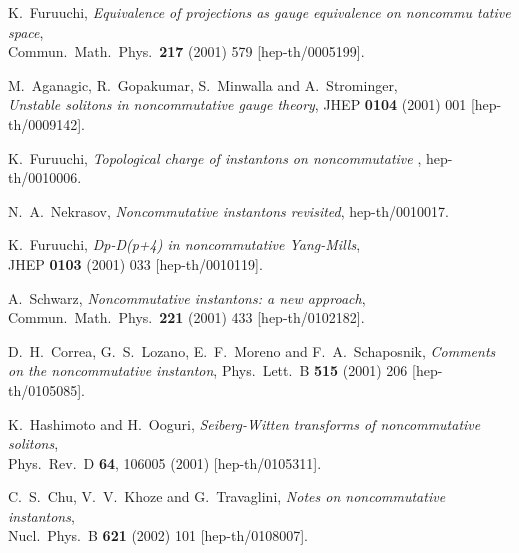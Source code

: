 \documentclass[a4paper,11pt,english]{article}
\numberwithin{equation}{section}
\renewcommand{\=}{\ =\ }
\begin{document}
\begin{thebibliography}{99}
         K.~Furuuchi,
         {\em Equivalence of projections as gauge equivalence on noncommu%
tative space},\\
         Commun.\ Math.\ Phys.\  {\bf 217} (2001) 579
         [hep-th/0005199].

         M.~Aganagic, R.~Gopakumar, S.~Minwalla and A.~Strominger,\\
         {\em Unstable solitons in noncommutative gauge theory},
         JHEP {\bf 0104} (2001) 001
         [hep-th/0009142].

         K.~Furuuchi,
         {\em Topological charge of \coordHE{} instantons on noncommutative \coordHE{}},
         hep-th/0010006.

         N.~A.~Nekrasov,
         {\em Noncommutative instantons revisited},
         hep-th/0010017.

         K.~Furuuchi,
         {\em Dp-D(p+4) in noncommutative Yang-Mills},\\
         JHEP {\bf 0103} (2001) 033
         [hep-th/0010119].

         A.~Schwarz,
         {\em Noncommutative instantons: a new approach},\\
         Commun.\ Math.\ Phys.\  {\bf 221} (2001) 433
         [hep-th/0102182].

         D.~H.~Correa, G.~S.~Lozano, E.~F.~Moreno and F.~A.~Schaposnik,
         {\em Comments on the \coordHE{} noncommutative instanton},
         Phys.\ Lett.\ B {\bf 515} (2001) 206
         [hep-th/0105085].

         K.~Hashimoto and H.~Ooguri,
         {\em Seiberg-Witten transforms of noncommutative solitons},\\
         Phys.\ Rev.\ D {\bf 64}, 106005 (2001)
         [hep-th/0105311].

         C.~S.~Chu, V.~V.~Khoze and G.~Travaglini,
         {\em Notes on noncommutative instantons},\\
         Nucl.\ Phys.\ B {\bf 621} (2002) 101
         [hep-th/0108007].


\end{thebibliography}
\end{document}

